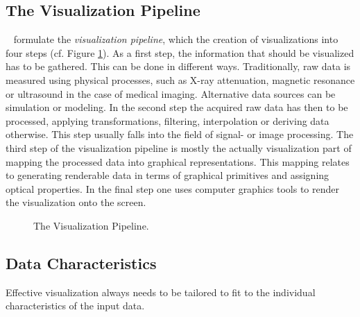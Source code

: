 \subsection{The Visualization Pipeline}
\label{sec:background:vis:vispipeline}

\CN~ formulate the \emph{visualization pipeline}, which  the creation of visualizations into four steps (cf. Figure \ref{fig:vispipeline}).
As a first step, the information that should be visualized has to be gathered.
This can be done in different ways. 
Traditionally, raw data is measured using physical processes, such as X-ray attenuation, magnetic resonance or ultrasound in the case of medical imaging.
Alternative data sources can be simulation or modeling.
In the second step the acquired raw data has then to be processed,  applying transformations, filtering, interpolation or deriving data otherwise.
This step usually falls into the field of signal- or image processing.
The third step of the visualization pipeline is mostly the actually visualization part of mapping the processed data into graphical representations.
This mapping relates to generating renderable data in terms of graphical primitives and assigning optical properties.
In the final step one uses computer graphics tools to render the visualization onto the screen.

\begin{figure}[ht]
	\centering
	
	\caption{The Visualization Pipeline.}
	\label{fig:vispipeline}
\end{figure}


\subsection{Data Characteristics}
\label{sec:Background:DataCharacteristics}
Effective visualization always needs to be tailored to fit to the individual characteristics of the input data.

